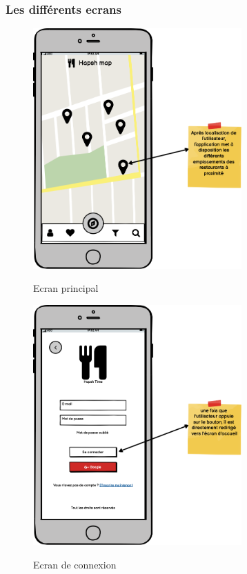 \subsubsection{Les différents ecrans}
\begin{figure}[!h]
    \centering
    \includegraphics[width=8cm]{images/Chapitre3/maquettes_balsamiq/Acceuil.png}
    \label{fig:acceuil}
    \caption{Ecran principal}
\end{figure} 
\begin{figure}[!h]
    \centering
    \includegraphics[width=8cm]{images/Chapitre3/maquettes_balsamiq/Connection.png}
    \label{fig:connexion}
    \caption{Ecran de connexion}
\end{figure} 
\newpage
